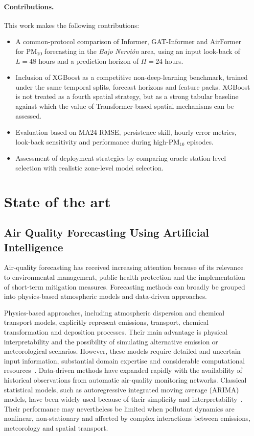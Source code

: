\documentclass[11pt]{article}
\begin{document}
\paragraph{Contributions.}
This work makes the following contributions:
\begin{itemize}[leftmargin=1.4em,itemsep=0.25em]
\item A common-protocol comparison of Informer, GAT-Informer and AirFormer for PM$_{10}$ forecasting in the \textit{Bajo Nervi\'on} area, using an input look-back of $L=48$ hours and a prediction horizon of $H=24$ hours.
\item Inclusion of XGBoost as a competitive non-deep-learning benchmark, trained under the same temporal splits, forecast horizons and feature packs. XGBoost is not treated as a fourth spatial strategy, but as a strong tabular baseline against which the value of Transformer-based spatial mechanisms can be assessed.
\item Evaluation based on MA24 RMSE, persistence skill, hourly error metrics, look-back sensitivity and performance during high-PM$_{10}$ episodes.
\item Assessment of deployment strategies by comparing oracle station-level selection with realistic zone-level model selection.
\end{itemize}

\section{State of the art}
\label{sec:sota}
\subsection{Air Quality Forecasting Using Artificial Intelligence}

Air-quality forecasting has received increasing attention because of its relevance to environmental management, public-health protection and the implementation of short-term mitigation measures. Forecasting methods can broadly be grouped into physics-based atmospheric models and data-driven approaches.

Physics-based approaches, including atmospheric dispersion and chemical transport models, explicitly represent emissions, transport, chemical transformation and deposition processes. Their main advantage is physical interpretability and the possibility of simulating alternative emission or meteorological scenarios. However, these models require detailed and uncertain input information, substantial domain expertise and considerable computational resources~\cite{AQAT}. Data-driven methods have expanded rapidly with the availability of historical observations from automatic air-quality monitoring networks. Classical statistical models, such as autoregressive integrated moving average (ARIMA) models, have been widely used because of their simplicity and interpretability~\cite{Box2015}. Their performance may nevertheless be limited when pollutant dynamics are nonlinear, non-stationary and affected by complex interactions between emissions, meteorology and spatial transport.
\end{document}
